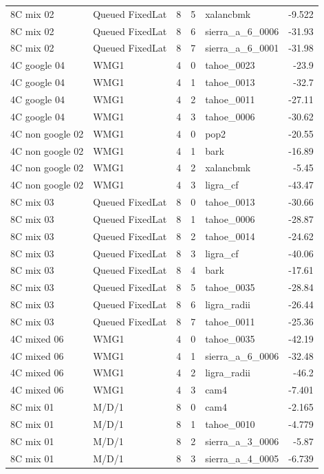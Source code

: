\begin{tabular}{llrrlr}
8C mix 02 & Queued FixedLat & 8 & 5 & xalancbmk & -9.522 \\
8C mix 02 & Queued FixedLat & 8 & 6 & sierra\_a\_6\_0006 & -31.93 \\
8C mix 02 & Queued FixedLat & 8 & 7 & sierra\_a\_6\_0001 & -31.98 \\
4C google 04 & WMG1 & 4 & 0 & tahoe\_0023 & -23.9 \\
4C google 04 & WMG1 & 4 & 1 & tahoe\_0013 & -32.7 \\
4C google 04 & WMG1 & 4 & 2 & tahoe\_0011 & -27.11 \\
4C google 04 & WMG1 & 4 & 3 & tahoe\_0006 & -30.62 \\
4C non google 02 & WMG1 & 4 & 0 & pop2 & -20.55 \\
4C non google 02 & WMG1 & 4 & 1 & bark & -16.89 \\
4C non google 02 & WMG1 & 4 & 2 & xalancbmk & -5.45 \\
4C non google 02 & WMG1 & 4 & 3 & ligra\_cf & -43.47 \\
8C mix 03 & Queued FixedLat & 8 & 0 & tahoe\_0013 & -30.66 \\
8C mix 03 & Queued FixedLat & 8 & 1 & tahoe\_0006 & -28.87 \\
8C mix 03 & Queued FixedLat & 8 & 2 & tahoe\_0014 & -24.62 \\
8C mix 03 & Queued FixedLat & 8 & 3 & ligra\_cf & -40.06 \\
8C mix 03 & Queued FixedLat & 8 & 4 & bark & -17.61 \\
8C mix 03 & Queued FixedLat & 8 & 5 & tahoe\_0035 & -28.84 \\
8C mix 03 & Queued FixedLat & 8 & 6 & ligra\_radii & -26.44 \\
8C mix 03 & Queued FixedLat & 8 & 7 & tahoe\_0011 & -25.36 \\
4C mixed 06 & WMG1 & 4 & 0 & tahoe\_0035 & -42.19 \\
4C mixed 06 & WMG1 & 4 & 1 & sierra\_a\_6\_0006 & -32.48 \\
4C mixed 06 & WMG1 & 4 & 2 & ligra\_radii & -46.2 \\
4C mixed 06 & WMG1 & 4 & 3 & cam4 & -7.401 \\
8C mix 01 & M/D/1 & 8 & 0 & cam4 & -2.165 \\
8C mix 01 & M/D/1 & 8 & 1 & tahoe\_0010 & -4.779 \\
8C mix 01 & M/D/1 & 8 & 2 & sierra\_a\_3\_0006 & -5.87 \\
8C mix 01 & M/D/1 & 8 & 3 & sierra\_a\_4\_0005 & -6.739 \\

\end{tabular}
